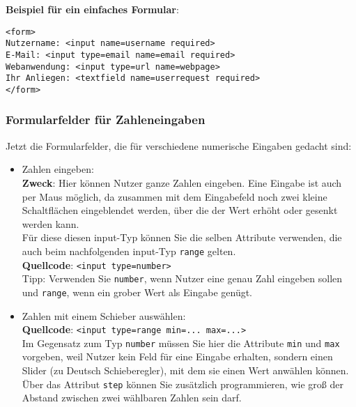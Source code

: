 \textbf{Beispiel für ein einfaches Formular}:

\begin{verbatim}
<form>
Nutzername: <input name=username required>
E-Mail: <input type=email name=email required>
Webanwendung: <input type=url name=webpage>
Ihr Anliegen: <textfield name=userrequest required>
</form>
\end{verbatim}

\subsubsection{Formularfelder für Zahleneingaben}

Jetzt die Formularfelder, die für verschiedene numerische Eingaben gedacht sind:

\begin{itemize}
	\item Zahlen eingeben:\\

	\textbf{Zweck}: Hier können Nutzer ganze Zahlen eingeben. Eine Eingabe ist auch per Maus möglich, da zusammen mit dem Eingabefeld noch zwei kleine Schaltflächen eingeblendet werden, über die der Wert erhöht oder gesenkt werden kann.\\
	
	Für diese diesen input-Typ können Sie die selben Attribute verwenden, die auch beim nachfolgenden input-Typ \verb|range| gelten. \\
	
	\textbf{Quellcode}: \verb|<input type=number>|\\

	Tipp: Verwenden Sie \verb|number|, wenn Nutzer eine genau Zahl eingeben sollen und \verb|range|, wenn ein grober Wert als Eingabe genügt.\\

	\item Zahlen mit einem Schieber auswählen:\\

	\textbf{Quellcode}: \verb|<input type=range min=... max=...>|\\

	Im Gegensatz zum Typ \verb|number| müssen Sie hier die Attribute \verb|min| und \verb|max| vorgeben, weil Nutzer kein Feld für eine Eingabe erhalten, sondern einen Slider (zu Deutsch Schieberegler), mit dem sie einen Wert anwählen können. Über das Attribut \verb|step| können Sie zusätzlich programmieren, wie groß der Abstand zwischen zwei wählbaren Zahlen sein darf.\\


\end{itemize}
